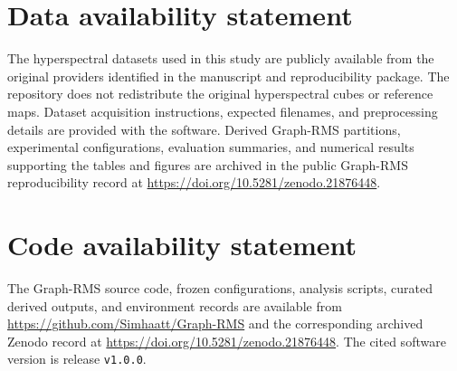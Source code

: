 \section*{Data availability statement}

The hyperspectral datasets used in this study are publicly available from the
original providers identified in the manuscript and reproducibility package.
The repository does not redistribute the original hyperspectral cubes or
reference maps. Dataset acquisition instructions, expected filenames, and
preprocessing details are provided with the software. Derived Graph-RMS
partitions, experimental configurations, evaluation summaries, and numerical
results supporting the tables and figures are archived in the public Graph-RMS
reproducibility record at
\url{https://doi.org/10.5281/zenodo.21876448}.

\section*{Code availability statement}

The Graph-RMS source code, frozen configurations, analysis scripts, curated
derived outputs, and environment records are available from
\url{https://github.com/Simhaatt/Graph-RMS} and the corresponding archived
Zenodo record at \url{https://doi.org/10.5281/zenodo.21876448}. The cited
software version is release \texttt{v1.0.0}.
